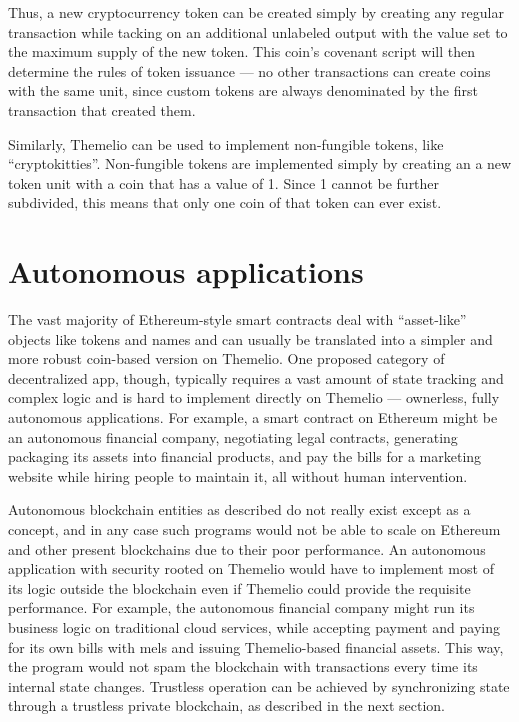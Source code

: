 \documentclass[headinclude,12pt]{scrbook}
\begin{document}
Thus, a new cryptocurrency token can be created simply by creating any regular transaction while tacking on an additional unlabeled output with the value set to the maximum supply of the new token. This coin's covenant script will then determine the rules of token issuance --- no other transactions can create coins with the same unit, since custom tokens are always denominated by the first transaction that created them.

Similarly, Themelio can be used to implement non-fungible tokens, like ``cryptokitties''. Non-fungible tokens are implemented simply by creating an a new token unit with a coin that has a value of 1. Since 1 cannot be further subdivided, this means that only one coin of that token can ever exist.

\section{Autonomous applications}

The vast majority of Ethereum-style smart contracts deal with ``asset-like'' objects like tokens and names and can usually be translated into a simpler and more robust coin-based version on Themelio. One proposed category of decentralized app, though, typically requires a vast amount of state tracking and complex logic and is hard to implement directly on Themelio --- ownerless, fully autonomous applications. For example, a smart contract on Ethereum might be an autonomous financial company, negotiating legal contracts, generating packaging its assets into financial products, and pay the bills for a marketing website while hiring people to maintain it, all without human intervention.

Autonomous blockchain entities as described do not really exist except as a concept, and in any case such programs would not be able to scale on Ethereum and other present blockchains due to their poor performance. An autonomous application with security rooted on Themelio would have to implement most of its logic outside the blockchain even if Themelio could provide the requisite performance. For example, the autonomous financial company might run its business logic on traditional cloud services, while accepting payment and paying for its own bills with mels and issuing Themelio-based financial assets. This way, the program would not spam the blockchain with transactions every time its internal state changes. Trustless operation can be achieved by synchronizing state through a trustless private blockchain, as described in the next section.
\end{document}
